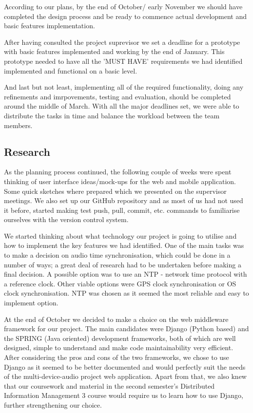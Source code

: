 \documentclass{l3proj}
\begin{document}
According to our plans, by the end of October/ early November we should have completed the design process and be ready to commence actual development and basic features implementation.

After having consulted the project suprevisor we set a deadline for a prototype with basic features implemented and working by the end of January. This prototype needed to have all the 'MUST HAVE' requirements we had identified implemented and functional on a basic level.

And last but not least, implementing all of the required functionality, doing any refinements and imrpovements, testing and evaluation, should be completed around the middle of March. With all the major deadlines set, we were able to distribute the tasks in time and balance the workload between the team members.


\subsection{Research}

As the planning process continued, the following couple of weeks were spent thinking of user interface ideas/mock-ups for the web and mobile application. Some quick sketches where prepared which we presented on the supervisor meetings. We also set up our GitHub repository and as most of us had not used it before, started making test push, pull, commit, etc. commands to familiarise ourselves with the version control system.

We started thinking about what technology our project is going to utilise and how to implement the key features we had identified. One of the main tasks was to make a decision on audio time synchronisation, which could be done in a number of ways; a great deal of research had to be undertaken before making a final decision. A possible option was to use an NTP - network time protocol with a reference clock. Other viable options were GPS clock synchronisation or OS clock synchronisation. NTP was chosen as it seemed the most reliable and easy to implement option.

At the end of October we decided to make a choice on the web middleware framework for our project. The main candidates were Django (Python based) and the SPRING (Java oriented) development frameworks, both of which are well designed, simple to understand and make code maintainability very efficient. After considering the pros and cons of the two frameworks, we chose to use Django as it seemed to be better documented and would perfectly suit the needs of the multi-device-audio project web application. Apart from that, we also knew that our coursework and material in the second semester's Distributed Information Management 3 course would require us to learn how to use Django, further strengthening our choice.
\end{document}
